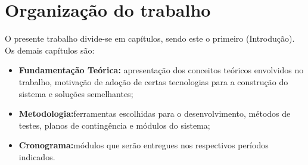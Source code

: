 \section{Organização do trabalho}
O presente trabalho divide-se em capítulos, sendo este o primeiro (Introdução). Os demais capítulos são:

\begin{itemize}
  \item \textbf{Fundamentação Teórica:} apresentação dos conceitos teóricos envolvidos no trabalho, motivação de
  adoção de certas tecnologias para a construção do sistema e soluções semelhantes;
  \item \textbf{Metodologia:}ferramentas escolhidas para o desenvolvimento, métodos de testes, planos de contingência e módulos
  do sistema;
  \item \textbf{Cronograma:}módulos que serão entregues nos respectivos períodos indicados.
\end{itemize}
